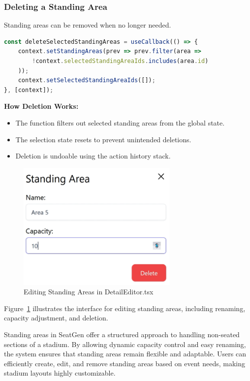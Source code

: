\subsubsection{Deleting a Standing Area}
Standing areas can be removed when no longer needed.

\begin{lstlisting}[language=TypeScript, caption=Deleting Standing Areas, label=lst:delete-standingarea]
const deleteSelectedStandingAreas = useCallback(() => {
    context.setStandingAreas(prev => prev.filter(area => 
        !context.selectedStandingAreaIds.includes(area.id)
    ));
    context.setSelectedStandingAreaIds([]);
}, [context]);
\end{lstlisting}

\textbf{How Deletion Works:}
\begin{itemize}
    \item The function filters out selected standing areas from the global state.
    \item The selection state resets to prevent unintended deletions.
    \item Deletion is undoable using the action history stack.
\end{itemize}

\begin{figure}[H]
    \centering
    \includegraphics[width=0.7\textwidth]{pics/DetailEditorStandingArea.png}
    \caption{Editing Standing Areas in DetailEditor.tsx}
    \label{fig:detail-editor-standingarea}
\end{figure}

Figure~\ref{fig:detail-editor-standingarea} illustrates the interface for editing standing areas, including renaming, capacity adjustment, and deletion.

Standing areas in SeatGen offer a structured approach to handling non-seated sections of a stadium. By allowing dynamic capacity control and easy renaming, the system ensures that standing areas remain flexible and adaptable. Users can efficiently create, edit, and remove standing areas based on event needs, making stadium layouts highly customizable.

